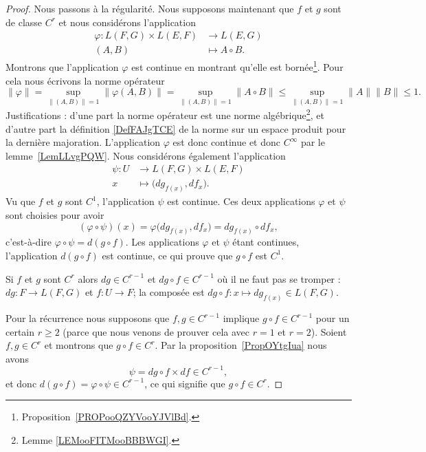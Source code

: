 \begin{proof}
    Nous passons à la régularité. Nous supposons maintenant que \( f\) et \( g\) sont de classe \( C^r\) et nous considérons l'application
    \begin{equation}
        \begin{aligned}
            \varphi\colon L(F,G)\times L(E,F)&\to L(E,G) \\
            (A,B)&\mapsto A\circ B.
        \end{aligned}
    \end{equation}
    Montrons que l'application \( \varphi\) est continue en montrant qu'elle est bornée\footnote{Proposition~\ref{PROPooQZYVooYJVlBd}.}. Pour cela nous écrivons la norme opérateur
    \begin{equation}
        \| \varphi \|=\sup_{\| (A,B) \|=1}\| \varphi(A,B) \|=\sup_{\| (A,B) \|=1}\| A\circ B \|\leq\sup_{\| (A,B) \|=1}\| A \|\| B \|\leq 1.
    \end{equation}
    Justifications : d'une part la norme opérateur est une norme algébrique\footnote{Lemme \ref{LEMooFITMooBBBWGI}.}, et d'autre part la définition \ref{DefFAJgTCE} de la norme sur un espace produit pour la dernière majoration. L'application \( \varphi\) est donc continue et donc \(  C^{\infty}\) par le lemme~\ref{LemLLvgPQW}. Nous considérons également l'application
    \begin{equation}
        \begin{aligned}
        \psi\colon U&\to L(F,G)\times L(E,F) \\
        x&\mapsto \big( dg_{f(x)},df_x \big).
        \end{aligned}
    \end{equation}
    Vu que \( f\) et \( g\) sont \( C^1\), l'application \( \psi\) est continue. Ces deux applications \( \varphi\) et \( \psi\) sont choisies pour avoir
    \begin{equation}
        (\varphi\circ\psi)(x)=\varphi\big( dg_{f(x)},df_x \big)=dg_{f(x)}\circ df_x,
    \end{equation}
    c'est-à-dire \( \varphi\circ\psi=d(g\circ f)\). Les applications \( \varphi\) et \( \psi\) étant continues, l'application \( d(g\circ f)\) est continue, ce qui prouve que \( g\circ f\) est \( C^1\).

    Si \( f\) et \( g\) sont \( C^r\) alors \( dg\in C^{r-1}\) et \( dg\circ f\in C^{r-1}\) où il ne faut pas se tromper : \( dg\colon F\to L(F,G)\) et \( f\colon U\to F\); la composée est \( dg\circ f\colon x\mapsto dg_{f(x)}\in L(F,G)\).

    Pour la récurrence nous supposons que \( f,g\in C^{r-1}\) implique \( g\circ f\in C^{r-1}\) pour un certain \( r\geq 2\) (parce que nous venons de prouver cela avec \( r=1\) et \( r=2\)). Soient \( f,g\in C^r\) et montrons que \( g\circ f\in C^r\). Par la proposition~\ref{PropOYtgIua} nous avons
    \begin{equation}
        \psi=dg\circ f\times df\in C^{r-1},
    \end{equation}
    et donc \( d(g\circ f)=\varphi\circ\psi\in C^{r-1}\), ce qui signifie que \( g\circ f\in C^r\).
\end{proof}

